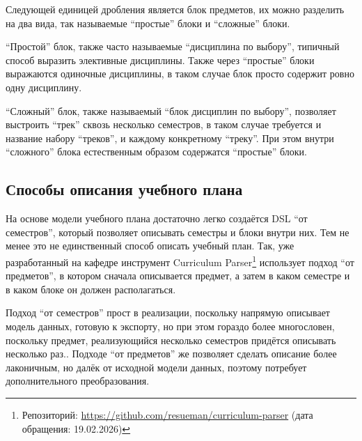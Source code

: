 Следующей единицей дробления является блок предметов, их можно разделить на два вида, так называемые \enquote{простые} блоки и \enquote{сложные} блоки.

\enquote{Простой} блок, также часто называемые \enquote{дисциплина по выбору}, типичный способ выразить элективные дисциплины.
Также через \enquote{простые} блоки выражаются одиночные дисциплины, в таком случае блок просто содержит ровно одну дисциплину.

\enquote{Сложный} блок, также называемый \enquote{блок дисциплин по выбору}, позволяет выстроить \enquote{трек} сквозь несколько семестров, в таком случае требуется и название набору \enquote{треков}, и каждому конкретному \enquote{треку}.
При этом внутри \enquote{сложного} блока естественным образом содержатся \enquote{простые} блоки.

\subsection{Способы описания учебного плана}

На основе модели учебного плана достаточно легко создаётся DSL \enquote{от семестров}, который позволяет описывать семестры и блоки внутри них.
Тем не менее это не единственный способ описать учебный план.
Так, уже разработанный на кафедре инструмент Curriculum Parser\footnote{Репозиторий: \url{https://github.com/resueman/curriculum-parser} (дата обращения: 19.02.2026)} использует подход \enquote{от предметов}, в котором сначала описывается предмет, а затем в каком семестре и в каком блоке он должен располагаться.

Подход \enquote{от семестров} прост в реализации, поскольку напрямую описывает модель данных, готовую к экспорту, но при этом гораздо более многословен, поскольку предмет, реализующийся несколько семестров придётся описывать несколько раз..
Подходе \enquote{от предметов} же позволяет сделать описание более лаконичным, но далёк от исходной модели данных, поэтому потребует дополнительного преобразования.
